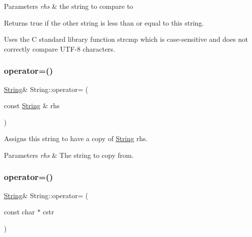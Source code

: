 \begin{DoxyParams}{Parameters}
{\em rhs} & the string to compare to\\
\hline
\end{DoxyParams}
\begin{DoxyReturn}{Returns}
true if the other string is less than or equal to this string.
\end{DoxyReturn}
Uses the C standard library function strcmp which is case-\/sensitive and does not correctly compare U\+T\+F-\/8 characters. \mbox{\label{class_string_aeb3b38d9acd37e511d82c9f4dc7565a3}} 
\subsubsection{\texorpdfstring{operator=()}{operator=()}\hspace{0.1cm}{\footnotesize\ttfamily [1/3]}}
{\footnotesize\ttfamily \hyperlink{class_string}{String}\& String\+::operator= (\begin{DoxyParamCaption}\item[{const \hyperlink{class_string}{String} \&}]{rhs }\end{DoxyParamCaption})}



Assigns this string to have a copy of \hyperlink{class_string}{String} rhs. 


\begin{DoxyParams}{Parameters}
{\em rhs} & The string to copy from. \\
\hline
\end{DoxyParams}
\mbox{\label{class_string_ab7151855d8e95ab3703f0284298d9ac1}} 
\subsubsection{\texorpdfstring{operator=()}{operator=()}\hspace{0.1cm}{\footnotesize\ttfamily [2/3]}}
{\footnotesize\ttfamily \hyperlink{class_string}{String}\& String\+::operator= (\begin{DoxyParamCaption}\item[{const char $\ast$}]{cstr }\end{DoxyParamCaption})}




